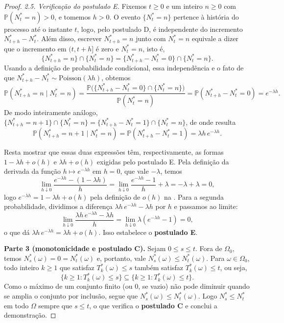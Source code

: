 \documentclass[12pt,portuguese]{article}
\theoremstyle{definition}
\theoremstyle{plainexercise}
\theoremstyle{starredexercise}
\theoremstyle{definition}
\begin{document}
\begin{proof}
\smallskip
\noindent\textit{2.5. Verificação do postulado E.}
Fixemos $t\geqslant0$ e um inteiro $n\geqslant0$ com $\mathbb{P}(N_t^*=n)>0$, e
tomemos $h>0$. O evento $\{N_t^*=n\}$ pertence à história do processo até o
instante $t$, logo, pelo postulado D, é independente do incremento
$N_{t+h}^*-N_t^*$. Além disso, escrever $N_{t+h}^*=n$ junto com $N_t^*=n$
equivale a dizer que o incremento em $(t,t+h]$ é zero e $N_t^*=n$, isto é,
\[
  \{N_{t+h}^*=n\}\cap\{N_t^*=n\}=\{N_{t+h}^*-N_t^*=0\}\cap\{N_t^*=n\}.
\]
Usando a definição de probabilidade condicional, essa independência e o fato de
que $N_{t+h}^*-N_t^*\sim\mathrm{Poisson}(\lambda h)$, obtemos
\[
  \mathbb{P}(N_{t+h}^*=n\mid N_t^*=n)
  =\frac{\mathbb{P}\bigl(\{N_{t+h}^*-N_t^*=0\}\cap\{N_t^*=n\}\bigr)}{\mathbb{P}(N_t^*=n)}
  =\mathbb{P}(N_{t+h}^*-N_t^*=0)
  =e^{-\lambda h}.
\]
De modo inteiramente análogo, $\{N_{t+h}^*=n+1\}\cap\{N_t^*=n\}=\{N_{t+h}^*-N_t^*=1\}\cap\{N_t^*=n\}$,
de onde resulta
\[
  \mathbb{P}(N_{t+h}^*=n+1\mid N_t^*=n)
  =\mathbb{P}(N_{t+h}^*-N_t^*=1)
  =\lambda h\,e^{-\lambda h}.
\]

Resta mostrar que essas duas expressões têm, respectivamente, as formas
$1-\lambda h+o(h)$ e $\lambda h+o(h)$ exigidas pelo postulado E. Pela definição
da derivada da função
$h\mapsto e^{-\lambda h}$ em $h=0$, que vale $-\lambda$, temos
\[
  \lim_{h\downarrow 0}\frac{e^{-\lambda h}-(1-\lambda h)}{h}
  =\lim_{h\downarrow 0}\frac{e^{-\lambda h}-1}{h}+\lambda
  =-\lambda+\lambda=0,
\]
logo $e^{-\lambda h}=1-\lambda h+o(h)$ pela definição de $o(h)$ na
. Para a segunda probabilidade, dividimos a diferença
$\lambda h\,e^{-\lambda h}-\lambda h$ por $h$ e passamos ao limite:
\[
  \lim_{h\downarrow 0}\frac{\lambda h\,e^{-\lambda h}-\lambda h}{h}
  =\lim_{h\downarrow 0}\lambda(e^{-\lambda h}-1)
  =0,
\]
o que dá $\lambda h\,e^{-\lambda h}=\lambda h+o(h)$. Isso estabelece o
\textbf{postulado E}.

\medskip
\noindent\textbf{Parte 3 (monotonicidade e postulado C).}
Sejam $0\leqslant s\leqslant t$. Fora de $\Omega_0$, temos
$N_s^*(\omega)=0=N_t^*(\omega)$ e, portanto, vale
$N_s^*(\omega)\leqslant N_t^*(\omega)$.
Para $\omega\in\Omega_0$, todo inteiro $k\geqslant1$ que satisfaz
$T_k^*(\omega)\leqslant s$ também satisfaz $T_k^*(\omega)\leqslant t$, ou seja,
\[
  \{k\geqslant1:T_k^*(\omega)\leqslant s\}\subseteq\{k\geqslant1:T_k^*(\omega)\leqslant t\}.
\]
Como o máximo de um conjunto finito (ou $0$, se vazio) não pode diminuir quando
se amplia o conjunto por inclusão, segue que $N_s^*(\omega)\leqslant N_t^*(\omega)$.
Logo $N_s^*\leqslant N_t^*$ em todo $\Omega$ sempre que $s\leqslant t$, o que
verifica o \textbf{postulado C} e conclui a demonstração.
\end{proof}
\end{document}
